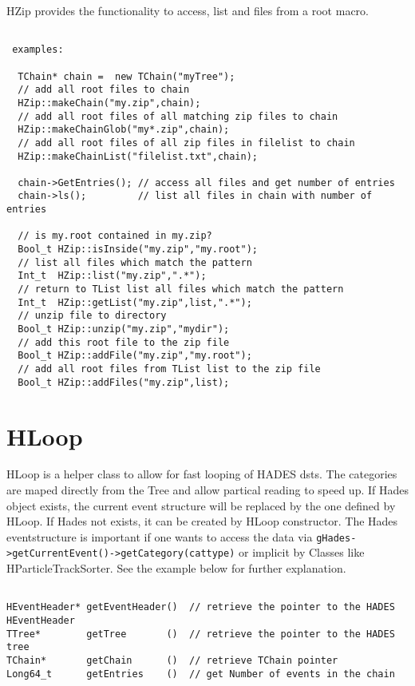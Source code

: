 HZip provides the functionality to access, list and files from
a root macro.


\begin{lstlisting}
 
 examples:

  TChain* chain =  new TChain("myTree");
  // add all root files to chain
  HZip::makeChain("my.zip",chain);            
  // add all root files of all matching zip files to chain  
  HZip::makeChainGlob("my*.zip",chain); 
  // add all root files of all zip files in filelist to chain      
  HZip::makeChainList("filelist.txt",chain);  

  chain->GetEntries(); // access all files and get number of entries
  chain->ls();         // list all files in chain with number of entries
  
  // is my.root contained in my.zip?
  Bool_t HZip::isInside("my.zip","my.root"); 
  // list all files which match the pattern  
  Int_t  HZip::list("my.zip",".*");          
  // return to TList list all files which match the pattern  
  Int_t  HZip::getList("my.zip",list,".*"); 
  // unzip file to directory 
  Bool_t HZip::unzip("my.zip","mydir"); 
  // add this root file to the zip file     
  Bool_t HZip::addFile("my.zip","my.root");  
  // add all root files from TList list to the zip file
  Bool_t HZip::addFiles("my.zip",list);     
\end{lstlisting}

\section{HLoop}


HLoop is a helper class to allow for fast looping of HADES dsts.
The categories are maped directly from the Tree and allow partical
reading to speed up. If Hades object exists, the current event structure
will be replaced by the one defined by HLoop. If Hades not exists, it
can be created by HLoop constructor. The Hades eventstructure is important
if one wants to access the data via\newline 
\verb+gHades->getCurrentEvent()->getCategory(cattype)+
or implicit by Classes like HParticleTrackSorter. See the example below for
further explanation.


\begin{lstlisting}

HEventHeader* getEventHeader()  // retrieve the pointer to the HADES HEventHeader
TTree*        getTree       ()  // retrieve the pointer to the HADES tree
TChain*       getChain      ()  // retrieve TChain pointer
Long64_t      getEntries    ()  // get Number of events in the chain

\end{lstlisting}


